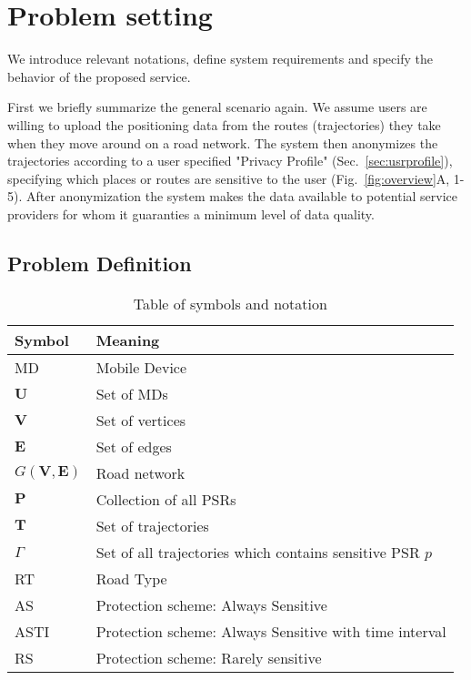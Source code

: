 \section{Problem setting}\label{sec:problemdef}

We introduce relevant notations, define system requirements and specify
the behavior of the proposed service. 


First we briefly summarize the general scenario again. We assume users are willing to upload the positioning data from the routes (trajectories) they take when they move around on a road network. The system then anonymizes the trajectories according to a user specified "Privacy Profile" (Sec.~\ref{sec:usrprofile}), specifying which places or routes are sensitive to the user (Fig.~\ref{fig:overview}A, 1-5). After anonymization the system makes the data available to potential service providers for whom it guaranties a minimum level of data quality.


\subsection{Problem Definition}\label{subsec:probdef}

\begin{table}
\begin{tabular*}{\columnwidth}{|l||p{}|}
\hline
Symbol		& Meaning \\\hline
MD		& Mobile Device \\\hline
$\mathbf{U}$	& Set of MDs \\\hline
$\mathbf{V}$	& Set of vertices \\\hline
$\mathbf{E}$	& Set of edges \\\hline
$G(\mathbf{V,E})$ & Road network \\\hline
$\mathbf{P}$	& Collection of all PSRs \\\hline
$\mathbf{T}$	& Set of trajectories \\\hline
$\Gamma$	& Set of all trajectories which contains sensitive PSR $p$ \\\hline
RT		& Road Type \\\hline
AS		& Protection scheme: Always Sensitive \\\hline
ASTI		& Protection scheme: Always Sensitive with time interval \\\hline
RS		& Protection scheme: Rarely sensitive \\\hline

\end{tabular*}
\caption{Table of symbols and notation} 
\label{tab:symbols}
\end{table}


